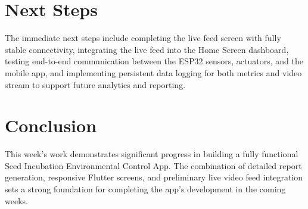 \documentclass[12pt,a4paper]{report}
\begin{document}
\section{Next Steps}

The immediate next steps include completing the live feed screen with fully stable connectivity, integrating the live feed into the Home Screen dashboard, testing end-to-end communication between the ESP32 sensors, actuators, and the mobile app, and implementing persistent data logging for both metrics and video stream to support future analytics and reporting.

\section{Conclusion}

This week’s work demonstrates significant progress in building a fully functional Seed Incubation Environmental Control App. The combination of detailed report generation, responsive Flutter screens, and preliminary live video feed integration sets a strong foundation for completing the app’s development in the coming weeks.
\end{document}

